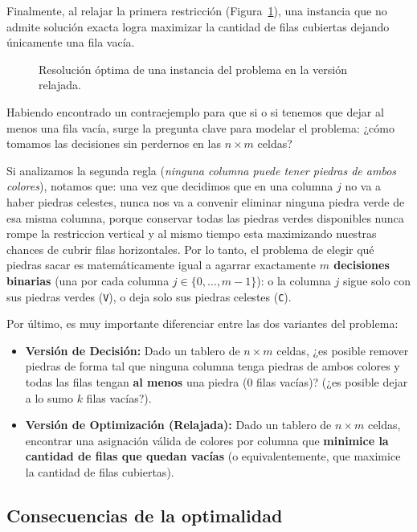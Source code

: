 Finalmente, al relajar la primera restricción (Figura~\ref{fig:relajacion}), una instancia que no admite solución exacta logra maximizar la cantidad de filas cubiertas dejando únicamente una fila vacía.

\begin{figure}[H]
    \centering
    
    \renewcommand{\thefigure}{1.2}
    \caption{Resolución óptima de una instancia del problema en la versión relajada.}
    \label{fig:relajacion}
\end{figure}
Habiendo encontrado un contraejemplo para que si o si tenemos que dejar al menos una fila vacía, surge la pregunta clave para modelar el problema:
¿cómo tomamos las decisiones sin perdernos en las $n \times m$ celdas?

Si analizamos la segunda regla (\textit{ninguna columna puede tener piedras de ambos colores}), notamos que: una vez que decidimos que en una columna $j$ no va a haber piedras celestes, nunca nos va a convenir eliminar ninguna piedra verde de esa misma columna, porque conservar todas las piedras verdes disponibles nunca rompe la restriccion vertical y al mismo tiempo esta maximizando nuestras chances de cubrir filas horizontales.
Por lo tanto, el problema de elegir qué piedras sacar es matemáticamente igual a agarrar exactamente \textbf{$m$ decisiones binarias} (una por cada columna $j \in \{0, \dots, m-1\}$): o la columna $j$ sigue solo con sus piedras verdes (\texttt{V}), o deja solo sus piedras celestes (\texttt{C}).

Por último, es muy importante diferenciar entre las dos variantes del problema:
\begin{itemize}
    \item \textbf{Versión de Decisión:} Dado un tablero de $n \times m$ celdas, ¿es posible remover piedras de forma tal que ninguna columna tenga piedras de ambos colores y todas las filas tengan \textbf{al menos} una piedra ($0$ filas vacías)? (¿es posible dejar a lo sumo $k$ filas vacías?).
    \item \textbf{Versión de Optimización (Relajada):} Dado un tablero de $n \times m$ celdas, encontrar una asignación válida de colores por columna que \textbf{minimice la cantidad de filas que quedan vacías} (o equivalentemente, que maximice la cantidad de filas cubiertas).
\end{itemize}

\subsection{Consecuencias de la optimalidad}

